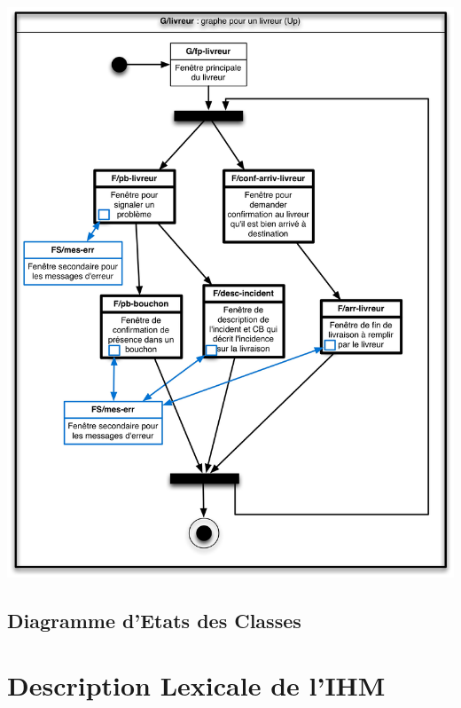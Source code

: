 \documentclass{report}
\begin{document}
\paragraph{}
~~\\
\begin{center}
\includegraphics[scale = 0.2]{images/g-livreur.jpg}
\end{center}

\section{Diagramme d'Etats des Classes}






\chapter{Description Lexicale de l'IHM}
\end{document}
